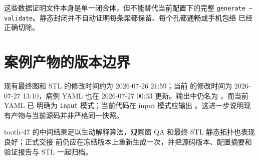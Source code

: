 这些数据证明文件本身是单一闭合体，但不能替代当前配置下的完整
\texttt{generate --validate}。静态封闭并不自动证明每条梁都保留、每个孔都通畅或手机包络
已经正确切除。

\section{案例产物的版本边界}

现有最终图和 STL 的修改时间约为 2026-07-26 21:59；当前
 的修改时间为 2026-07-27 13:10，病例 YAML 也在
2026-07-27 00:33 更新。输出中仍名为 ，而当前 YAML 已
明确为 \texttt{input} 模式；当前代码在 input 模式应输出
。这进一步说明现有产物与当前源码并非严格同一快照。

\begin{takeaway}
tooth-47 的中间结果足以生动解释算法，观察窗 QA 和最终 STL 静态拓扑也表现良好；正式交接
前仍应在冻结版本上重新生成一次，并把源码版本、配置摘要和验证报告与 STL 一起归档。
\end{takeaway}

